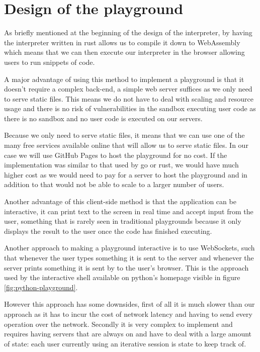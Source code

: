 \documentclass{article}
\begin{document}
\section{Design of the playground}

As briefly mentioned at the beginning of the design of the interpreter, by
having the interpreter written in rust allows us to compile it down to
WebAssembly which means that we can then execute our interpreter in the browser
allowing users to run snippets of code.

A major advantage of using this method to implement a playground is that it
doesn't require a complex back-end, a simple web server suffices as we only
need to serve static files. This means we do not have to deal with scaling and
resource usage and there is no risk of vulnerabilities in the sandbox executing
user code as there is no sandbox and no user code is executed on our servers.

Because we only need to serve static files, it means that we can use one of the
many free services available online that will allow us to serve static files.
In our case we will use GitHub Pages to host the playground for no cost. If the
implementation was similar to that used by go or rust, we would have much
higher cost as we would need to pay for a server to host the playground and in
addition to that would not be able to scale to a larger number of users.

Another advantage of this client-side method is that the application can be
interactive, it can print text to the screen in real time and accept input from
the user, something that is rarely seen in traditional playgrounds because it
only displays the result to the user once the code has finished executing.

Another approach to making a playground interactive is to use WebSockets, such
that whenever the user types something it is sent to the server and whenever
the server prints something it is sent by to the user's browser. This is the
approach used by the interactive shell available on python's homepage visible
in figure \ref{fig:python-playground}.

However this approach has some downsides, first of all it is much slower than
our approach as it has to incur the cost of network latency and having to send
every operation over the network. Secondly it is very complex to implement and
requires having servers that are always on and have to deal with a large amount
of state: each user currently using an iterative session is state to keep
track of.
\end{document}
